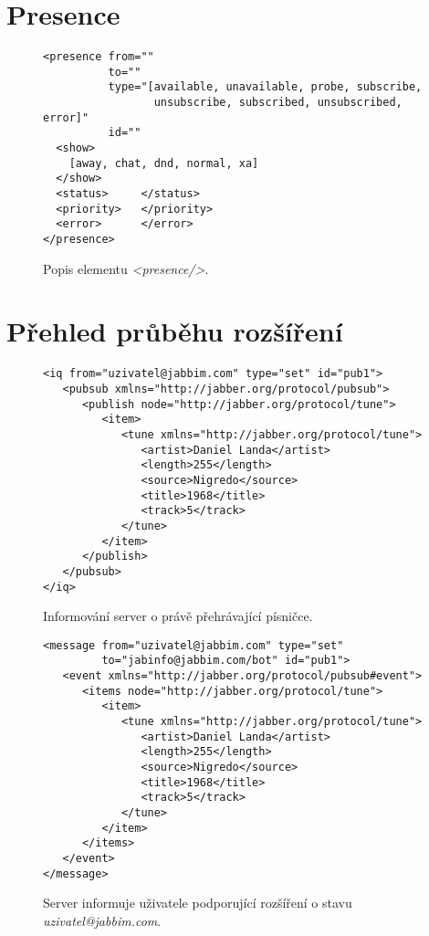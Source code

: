 \section{Presence}\label{Epresence}
\begin{figure}[h]
\begin{verbatim}
<presence from=""
          to=""
          type="[available, unavailable, probe, subscribe,
                 unsubscribe, subscribed, unsubscribed, error]"
          id=""
  <show>
    [away, chat, dnd, normal, xa]
  </show>
  <status>     </status>
  <priority>   </priority>
  <error>      </error>
</presence>
\end{verbatim} 
\caption{Popis elementu \textit{\textless presence/\textgreater}.}
 \label{picPresenceE}
\end{figure}

\newpage
\section{Přehled průběhu rozšíření}\label{Erozsireni}
\begin{figure}[ht]
\begin{verbatim}
<iq from="uzivatel@jabbim.com" type="set" id="pub1">
   <pubsub xmlns="http://jabber.org/protocol/pubsub">
      <publish node="http://jabber.org/protocol/tune">
         <item>
            <tune xmlns="http://jabber.org/protocol/tune">
               <artist>Daniel Landa</artist>
               <length>255</length>
               <source>Nigredo</source>
               <title>1968</title>
               <track>5</track>
            </tune>
         </item>
      </publish>
   </pubsub>
</iq>
\end{verbatim}  
\caption{Informování server o právě přehrávající písničce.}
 \label{picSPep1}
\end{figure}

\begin{figure}[ht]
\begin{verbatim}
<message from="uzivatel@jabbim.com" type="set"
         to="jabinfo@jabbim.com/bot" id="pub1">
   <event xmlns="http://jabber.org/protocol/pubsub#event">
      <items node="http://jabber.org/protocol/tune">
         <item>
            <tune xmlns="http://jabber.org/protocol/tune">
               <artist>Daniel Landa</artist>
               <length>255</length>
               <source>Nigredo</source>
               <title>1968</title>
               <track>5</track>
            </tune>
         </item>
      </items>
   </event>
</message>
\end{verbatim}  
\caption{Server informuje uživatele podporující rozšíření o stavu \textit{uzivatel@jabbim.com}.}
 \label{picSPep2}
\end{figure}

